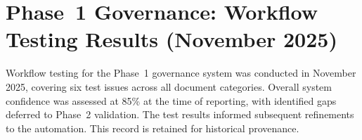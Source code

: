 
\section*{Phase~1 Governance: Workflow Testing Results (November 2025)}

Workflow testing for the Phase~1 governance system was conducted in November
2025, covering six test issues across all document categories. Overall system
confidence was assessed at 85\% at the time of reporting, with identified gaps
deferred to Phase~2 validation. The test results informed subsequent refinements
to the automation. This record is retained for historical provenance.

